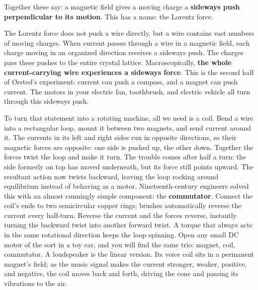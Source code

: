 \begin{mainline}
Together these say: a magnetic field gives a moving charge a \textbf{sideways push perpendicular to its motion}. This has a name: the Lorentz force.

The Lorentz force does not push a wire directly, but a wire contains vast numbers of moving charges. When current passes through a wire in a magnetic field, each charge moving in an organized direction receives a sideways push. The charges pass these pushes to the entire crystal lattice. Macroscopically, \textbf{the whole current-carrying wire experiences a sideways force}. This is the second half of Ørsted's experiment: current can push a compass, and a magnet can push current. The motors in your electric fan, toothbrush, and electric vehicle all turn through this sideways push.

To turn that statement into a rotating machine, all we need is a coil. Bend a wire into a rectangular loop, mount it between two magnets, and send current around it. The currents in its left and right sides run in opposite directions, so their magnetic forces are opposite: one side is pushed up, the other down. Together the forces twist the loop and make it turn. The trouble comes after half a turn: the side formerly on top has moved underneath, but its force still points upward. The resultant action now twists backward, leaving the loop rocking around equilibrium instead of behaving as a motor. Nineteenth-century engineers solved this with an almost cunningly simple component: the \textbf{commutator}. Connect the coil's ends to two semicircular copper rings; brushes automatically reverse the current every half-turn. Reverse the current and the forces reverse, instantly turning the backward twist into another forward twist. A torque that always acts in the same rotational direction keeps the loop spinning. Open any small DC motor of the sort in a toy car, and you will find the same trio: magnet, coil, commutator. A loudspeaker is the linear version. Its voice coil sits in a permanent magnet's field; as the music signal makes the current stronger, weaker, positive, and negative, the coil moves back and forth, driving the cone and passing its vibrations to the air.


\end{mainline}
